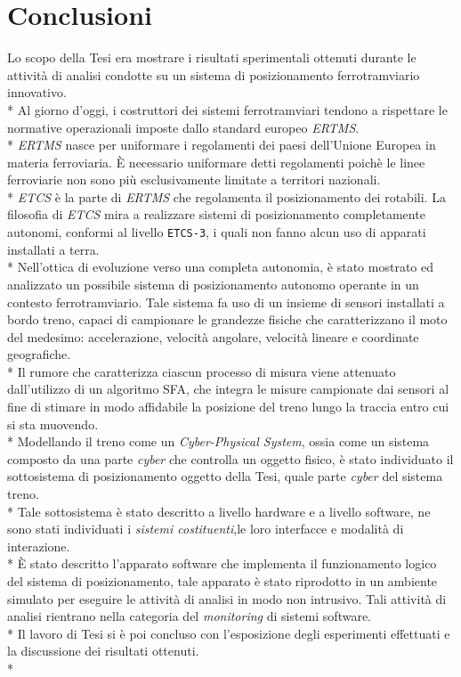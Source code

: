 \chapter{Conclusioni}
Lo scopo della Tesi era mostrare i risultati sperimentali ottenuti durante le attivit\`a di analisi condotte su un sistema di posizionamento ferrotramviario innovativo.\\*
Al giorno d'oggi, i costruttori dei sistemi ferrotramviari tendono a rispettare le normative operazionali imposte dallo standard europeo \emph{ERTMS}.\\*
\emph{ERTMS} nasce per uniformare i regolamenti dei paesi dell'Unione Europea in materia ferroviaria. \`E necessario uniformare detti regolamenti poich\`e le linee ferroviarie non sono pi\`u esclusivamente limitate a territori nazionali.\\*
\emph{ETCS} \`e la parte di \emph{ERTMS} che regolamenta il posizionamento dei rotabili. La filosofia di \emph{ETCS} mira a realizzare sistemi di posizionamento completamente autonomi, conformi al livello \texttt{ETCS-3}, i quali non fanno alcun uso di apparati installati a terra.\\*
Nell'ottica di evoluzione verso una completa autonomia, \`e stato mostrato ed analizzato un possibile sistema di posizionamento autonomo operante in un contesto ferrotramviario. Tale sistema fa uso di un insieme di sensori installati a bordo treno, capaci di campionare le grandezze fisiche che caratterizzano il moto del medesimo: accelerazione, velocit\`a angolare, velocit\`a lineare e coordinate geografiche.\\*
Il rumore che caratterizza ciascun processo di misura viene attenuato dall'utilizzo di un algoritmo SFA, che integra le misure campionate dai sensori al fine di stimare in modo affidabile la posizione del treno lungo la traccia entro cui si sta muovendo.\\*
Modellando il treno come un \emph{Cyber-Physical System}, ossia come un sistema composto da una parte \emph{cyber} che controlla un oggetto fisico, \`e stato individuato il sottosistema di posizionamento oggetto della Tesi, quale parte \emph{cyber} del sistema treno.\\*
Tale sottosistema \`e stato descritto a livello hardware e a livello software, ne sono stati individuati i \emph{sistemi costituenti},le loro interfacce e modalit\`a di interazione.\\*
\`E stato descritto l'apparato software che implementa il funzionamento logico del sistema di posizionamento, tale apparato \`e stato riprodotto in un ambiente simulato per eseguire le attivit\`a di analisi in modo non intrusivo. Tali attivit\`a di analisi rientrano nella categoria del \emph{monitoring} di sistemi software.\\*
Il lavoro di Tesi si \`e poi concluso con l'esposizione degli esperimenti effettuati e la discussione dei risultati ottenuti.\\*
